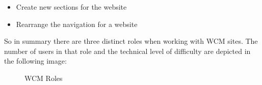 \begin{itemize}
\item Create new sections for the website
\item Rearrange the navigation for a website
\end{itemize}

So in summary there are three distinct roles when working with WCM
sites.  The number of users in that role and the technical level of
difficulty are depicted in the following image:

\begin{figure}[h!]
  \centering
  \caption{WCM Roles}
\end{figure}
\clearpage